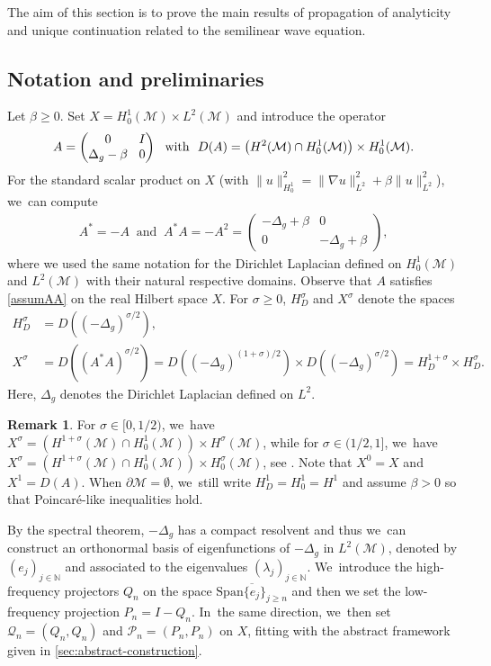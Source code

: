 \documentclass[10pt]{amsart}
\theoremstyle{definition}
\newtheorem{remark}[theorem]{Remark}
\let\mc\mathcal
\newcommand{\M}{\mc{M}}
\newcommand{\N}{\mathbb{N}}
\newcommand{\Q}{\mathcal{Q}}
\renewcommand{\P}{\mathcal{P}}
\providecommand{\norm}[1]{\lVert#1\rVert}
\begin{document}
The aim of this section is to prove the main results of propagation of analyticity and unique continuation related to the semilinear wave equation.

\subsection{Notation and preliminaries}\label{s:not_wave} Let $\beta\geq 0$. Set $X=H_0^1(\M)\times L^2(\M)$ and introduce the operator\vspace*{-3pt}
\begin{align*}\arraycolsep4.5pt
A=\begin{pmatrix}
0 & I \\
\Delta_g-\beta & 0
\end{pmatrix}\ \text{ with }\ D(A)=\big(H^2(\M)\cap H_0^1(\M)\big)\times H_0^1(\M).
\end{align*}
For the standard scalar product on $X$ (with $\norm{u}_{H^1_0}^2=\norm{\nabla u}_{L^2}^2+\beta \norm{u}_{L^2}^2$), we~can compute\vspace*{-3pt}
\begin{align*}
A^*=-A\ \text{ and }\ A^*A=-A^2=\begin{pmatrix}
-\Delta_g+\beta& 0 \\
0 & -\Delta_g+\beta
\end{pmatrix}\!,
\end{align*}
where we used the same notation for the Dirichlet Laplacian defined on $H^1_0(\M)$ and $L^2(\M)$ with their natural respective domains.
Observe that $A$ satisfies \cref{assumAA} on the real Hilbert space $X$. For $\sigma\geq 0$, $H^\sigma_D$ and $X^\sigma$ denote the spaces\vspace*{-3pt}
\begin{align}
\label{defSob}
H^\sigma_D&=D((-\Delta_g)^{\sigma/2}),\\
X^\sigma&= D((A^*A)^{\sigma/2})= D((-\Delta_g)^{(1+\sigma)/2})\times D((-\Delta_g)^{\sigma/2})=H^{1+\sigma}_D\times H^{\sigma}_D.
\end{align}
Here, $\Delta_g$ denotes the Dirichlet Laplacian defined on $L^2$.
\begin{remark}
For $\sigma \in [0,1/2)$, we~have $ X^\sigma=(H^{1+\sigma}(\M)\cap H_0^1(\M))\times H^\sigma(\M)$, while for $\sigma \in (1/2,1]$, we~have $ X^\sigma=(H^{1+\sigma}(\M)\cap H_0^1(\M))\times H_0^\sigma(\M)$, see \cite{G:67}. Note that $X^0=X$ and $X^1=D(A)$. When $\partial\M=\emptyset$, we~still write $H^1_D=H_0^1=H^1$ and assume $\beta>0$ so that Poincaré-like inequalities hold.
\end{remark}
By the spectral theorem, $-\Delta_g$ has a compact resolvent and thus we~can construct an orthonormal basis of eigenfunctions of $-\Delta_g$ in $L^2(\M)$, denoted by $(e_j)_{j\in \N}$ and associated to the eigenvalues $(\lambda_j)_{j\in \N}$. We~introduce the high-frequency projectors $Q_n$ on the space $\overline{\text{Span}\{e_j\}_{j\geq n}}$ and then we set the low-frequency projection $P_n=I-Q_n$. In~the same direction, we~then set $\Q_n=(Q_n, Q_n)$ and $\P_n=(P_n, P_n)$ on $X$, fitting with the abstract framework given in \cref{sec:abstract-construction}.
\end{document}
